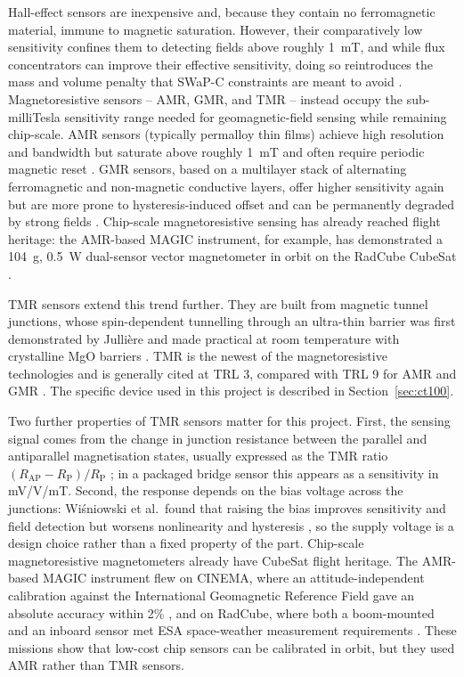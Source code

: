 \documentclass[12pt,a4paper]{article}
\begin{document}
Hall-effect sensors are inexpensive and, because they contain no ferromagnetic material, immune to magnetic saturation. However, their comparatively low sensitivity confines them to detecting fields above roughly \SI{1}{\milli\tesla}, and while flux concentrators can improve their effective sensitivity, doing so reintroduces the mass and volume penalty that SWaP-C constraints are meant to avoid \cite{amr-gmr-hall-bridging}. Magnetoresistive sensors -- AMR, GMR, and TMR -- instead occupy the sub-milliTesla sensitivity range needed for geomagnetic-field sensing while remaining chip-scale. AMR sensors (typically permalloy thin films) achieve high resolution and bandwidth but saturate above roughly \SI{1}{\milli\tesla} and often require periodic magnetic reset \cite{amr-gmr-hall-bridging}. GMR sensors, based on a multilayer stack of alternating ferromagnetic and non-magnetic conductive layers, offer higher sensitivity again but are more prone to hysteresis-induced offset and can be permanently degraded by strong fields \cite{amr-gmr-hall-bridging}. Chip-scale magnetoresistive sensing has already reached flight heritage: the AMR-based MAGIC instrument, for example, has demonstrated a \SI{104}{\gram}, \SI{0.5}{\watt} dual-sensor vector magnetometer in orbit on the RadCube CubeSat \cite{magic-radcube}.

TMR sensors extend this trend further. They are built from magnetic tunnel junctions, whose spin-dependent tunnelling through an ultra-thin barrier was first demonstrated by Julli\`ere \cite{julliere1975} and made practical at room temperature with crystalline MgO barriers \cite{parkin2004,yuasa2004}. TMR is the newest of the magnetoresistive technologies and is generally cited at TRL 3, compared with TRL 9 for AMR and GMR \cite{alves-thesis}. The specific device used in this project is described in Section~\ref{sec:ct100}.

Two further properties of TMR sensors matter for this project. First, the sensing signal comes from the change in junction resistance between the parallel and antiparallel magnetisation states, usually expressed as the TMR ratio $(R_{\text{AP}} - R_{\text{P}})/R_{\text{P}}$ \cite{julliere1975}; in a packaged bridge sensor this appears as a sensitivity in mV/V/mT. Second, the response depends on the bias voltage across the junctions: Wi\'sniowski et al.\ found that raising the bias improves sensitivity and field detection but worsens nonlinearity and hysteresis \cite{wisniowski2021}, so the supply voltage is a design choice rather than a fixed property of the part. Chip-scale magnetoresistive magnetometers already have CubeSat flight heritage. The AMR-based MAGIC instrument flew on CINEMA, where an attitude-independent calibration against the International Geomagnetic Reference Field gave an absolute accuracy within 2\% \cite{archer2015}, and on RadCube, where both a boom-mounted and an inboard sensor met ESA space-weather measurement requirements \cite{magic-radcube}. These missions show that low-cost chip sensors can be calibrated in orbit, but they used AMR rather than TMR sensors.
\end{document}
